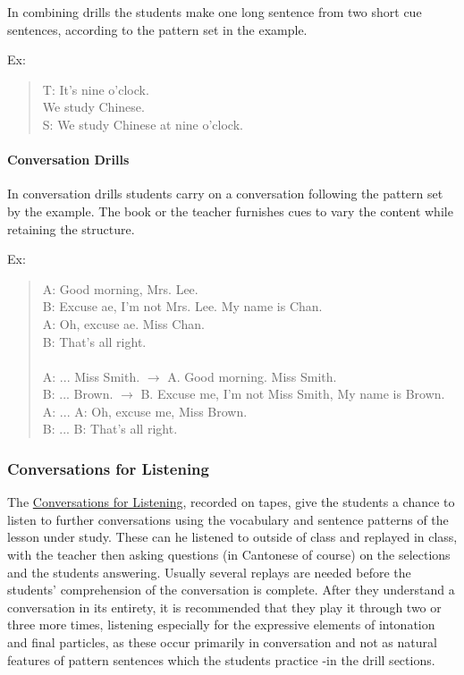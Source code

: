 In combining drills the students make one long sentence from two short cue sentences, according to the pattern set in the example.

\noindent Ex:
\begin{quote}
T: It's nine o'clock. \\
We study Chinese. \\
S: We study Chinese at nine o'clock. \\
\end{quote}

\paragraph{Conversation Drills}

In conversation drills students carry on a conversation following the pattern set by the example. The book or the teacher furnishes cues to vary the content while retaining the structure.

\noindent Ex:
\begin{quote}
A: Good morning, Mrs. Lee. \\
B: Excuse ae, I'm not Mrs. Lee. My name is Chan. \\
A: Oh, excuse ae. Miss Chan. \\
B: That's all right. \\
\\
A: ... Miss Smith. $\rightarrow$ A. Good morning. Miss Smith. \\
B: ... Brown. $\rightarrow$ B. Excuse me, I'm not Miss Smith, My name is Brown. \\
A: ... A: Oh, excuse me, Miss Brown. \\
B: ... B: That's all right.\\
\end{quote}


\subsubsection{Conversations for Listening}

The \underline{Conversations for Listening}, recorded on tapes, give the students a chance to listen to further conversations using the vocabulary and sentence patterns of the lesson under study. These can he listened to outside of class and replayed in class, with the teacher then asking questions (in Cantonese of course) on the selections and the students answering. Usually several replays are needed before the students' comprehension of the conversation is complete. After they understand a conversation in its entirety, it is recommended that they play it through two or three more times, listening especially for the expressive elements of intonation and final particles, as these occur primarily in conversation and not as natural features of pattern sentences which the students practice -in the drill sections.

